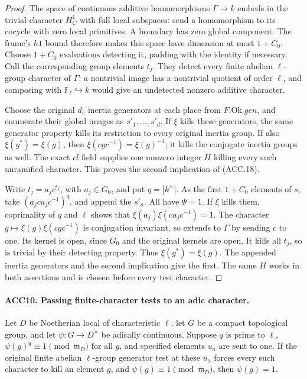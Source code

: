 \documentclass[11pt,a4paper]{article}
\numberwithin{equation}{section}
\theoremstyle{remark}\newtheorem{remark}[theorem]{Remark}
\begin{document}
\begin{proof}
The space of continuous additive homomorphisms \(\Gamma\to k\)
embeds in the trivial-character \(H^1_C\) with full local
subspaces: send a homomorphism to its cocycle with zero local
primitives.  A boundary has zero global component.  The frame's
\(h1\) bound therefore makes this space have dimension at most
\(1+C_0\).  Choose \(1+C_0\) evaluations detecting it, padding
with the identity if necessary.  Call the corresponding group
elements \(t_j\).  They detect every finite abelian
\(\ell\)-group character of \(\Gamma\): a nontrivial image has
a nontrivial quotient of order \(\ell\), and composing with
\(\mathbb F_\ell\hookrightarrow k\) would give an undetected
nonzero additive character.

Choose the original \(d_v\) inertia generators at each place
from \(F.\mathrm{Ok}.gen\), and enumerate their global images
as \(s'_1,\ldots,s'_d\).  If \(\xi\) kills these generators,
the same generator property kills its restriction to every original
inertia group.  If also \(\xi(g^*)=\xi(g)\), then
\(\xi(cgc^{-1})=\xi(g)^{-1}\); it kills the conjugate inertia
groups as well.  The exact \(cl\) field supplies one nonzero
integer \(H\) killing every such unramified character.  This
proves the second implication of (ACC.18).

Write \(t_j=a_jc^{\epsilon_j}\), with \(a_j\in G_0\), and
put \(q=|k^\times|\).  As the first \(1+C_0\) elements of
\(s\), take \((a_jca_jc^{-1})^q\), and append the \(s'_a\).
All have \(\Psi=1\).  If \(\xi\) kills them, coprimality
of \(q\) and \(\ell\) shows that
\(\xi(a_j)\xi(ca_jc^{-1})=1\).  The character
\(g\mapsto\xi(g)\xi(cgc^{-1})\) is conjugation invariant,
so extends to \(\Gamma\) by sending \(c\) to one.  Its
kernel is open, since \(G_0\) and the original kernels are open.
It kills all \(t_j\), so is trivial by their detecting property.
Thus \(\xi(g^*)=\xi(g)\).  The appended inertia generators
and the second implication give the first.  The same \(H\)
works in both assertions and is chosen before every test character.
\end{proof}

\paragraph{ACC10. Passing finite-character tests to an adic character.}
\label{claim:ACC10}
Let \(D\) be Noetherian local of characteristic \(\ell\),
let \(G\) be a compact topological group, and let
\(\psi:G\to D^\times\) be adically continuous.  Suppose
\(q\) is prime to \(\ell\), \(\psi(g)^q\equiv1\pmod{
\mathfrak m_D}\) for all \(g\), and specified elements \(u_a\)
are sent to one.  If the original finite abelian \(\ell\)-group
generator test at these \(u_a\) forces every such character to
kill an element \(g\), and \(\psi(g)\equiv1\pmod{
\mathfrak m_D}\), then \(\psi(g)=1\).
\end{document}

